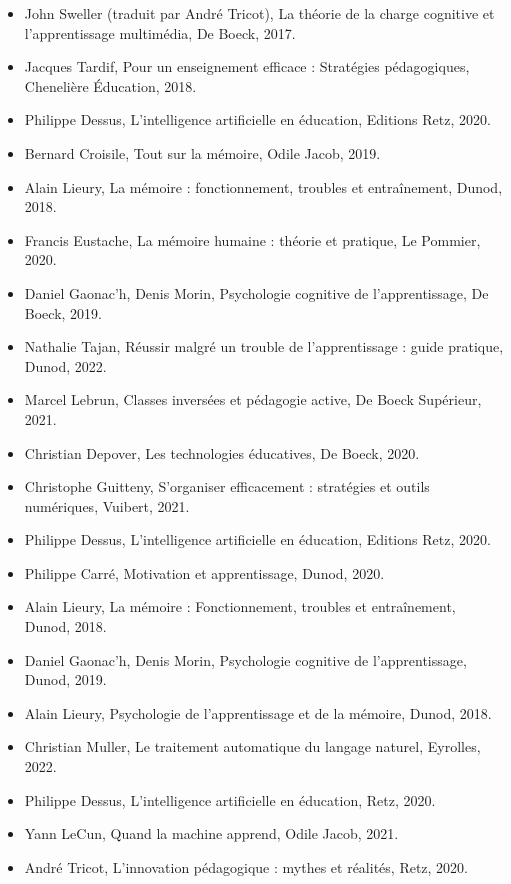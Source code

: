 \documentclass[12pt,a4paper]{report}
\begin{document}
\begin{itemize}
    \item John Sweller (traduit par André Tricot), La théorie de la charge cognitive et l'apprentissage multimédia, De Boeck, 2017.
    \item Jacques Tardif, Pour un enseignement efficace : Stratégies pédagogiques, Chenelière Éducation, 2018.
    \item Philippe Dessus, L'intelligence artificielle en éducation, Editions Retz, 2020.
    \item Bernard Croisile, Tout sur la mémoire, Odile Jacob, 2019.
    
    \item Alain Lieury, La mémoire : fonctionnement, troubles et entraînement, Dunod, 2018.
    \item Francis Eustache, La mémoire humaine : théorie et pratique, Le Pommier, 2020.
    \item Daniel Gaonac'h, Denis Morin, Psychologie cognitive de l'apprentissage, De Boeck, 2019.
    \item Nathalie Tajan, Réussir malgré un trouble de l’apprentissage : guide pratique, Dunod, 2022.
    
    \item Marcel Lebrun, Classes inversées et pédagogie active, De Boeck Supérieur, 2021.
    \item Christian Depover, Les technologies éducatives, De Boeck, 2020.
    \item Christophe Guitteny, S'organiser efficacement : stratégies et outils numériques, Vuibert, 2021.
    \item Philippe Dessus, L'intelligence artificielle en éducation, Editions Retz, 2020.

    \item Philippe Carré, Motivation et apprentissage, Dunod, 2020.
    \item Alain Lieury, La mémoire : Fonctionnement, troubles et entraînement, Dunod, 2018.
    \item Daniel Gaonac’h, Denis Morin, Psychologie cognitive de l’apprentissage, Dunod, 2019.
    \item Alain Lieury, Psychologie de l’apprentissage et de la mémoire, Dunod, 2018.
    
    \item Christian Muller, Le traitement automatique du langage naturel, Eyrolles, 2022.
    \item Philippe Dessus, L'intelligence artificielle en éducation, Retz, 2020.
    \item Yann LeCun, Quand la machine apprend, Odile Jacob, 2021.
    \item André Tricot, L'innovation pédagogique : mythes et réalités, Retz, 2020.
    

\end{itemize}
\end{document}
